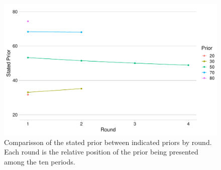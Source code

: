 \documentclass[12pt,a4paper]{article}
\begin{document}
	\begin{figure}
		\centering
		\includegraphics[scale=0.75]{../../results/rounds_stated_prior.pdf}
		\caption{Comparisson of the stated prior between indicated priors by round. Each round is the relative position of the prior being presented among the ten periods.}
		\label{fig:rounds_stated_priors}
	\end{figure}
\end{document}
